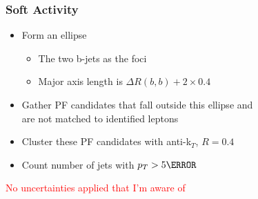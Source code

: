 \documentclass{beamer}
\begin{document}
\begin{frame}
  \frametitle{Soft Activity}
  \begin{itemize}
  \item Form an ellipse
    \begin{itemize}
    \item The two b-jets as the foci
    \item Major axis length is $\Delta R(b,b) + 2 \times 0.4$
    \end{itemize}
  \item Gather PF candidates that fall outside this ellipse and \\
    are not matched to identified leptons
  \item Cluster these PF candidates with anti-k$_T$, $R=0.4$
  \item Count number of jets with $p_T > 5 \GeV$
  \end{itemize}
  \begin{center}
    \textcolor{red}{No uncertainties applied that I'm aware of}
  \end{center}
\end{frame}
\end{document}
